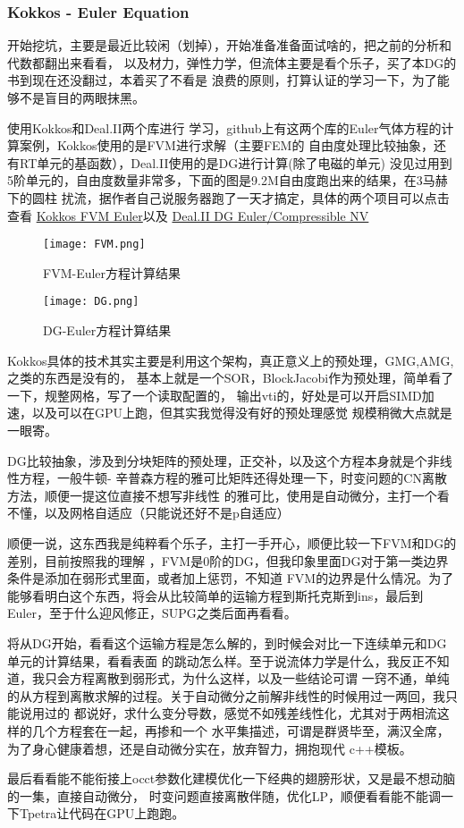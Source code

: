 \subsubsection{Kokkos - Euler Equation}
\graphicspath{ {./images/} }

开始挖坑，主要是最近比较闲（划掉），开始准备准备面试啥的，把之前的分析和代数都翻出来看看，
以及材力，弹性力学，但流体主要是看个乐子，买了本DG的书到现在还没翻过，本着买了不看是
浪费的原则，打算认证的学习一下，为了能够不是盲目的两眼抹黑。

使用Kokkos和Deal.II两个库进行
学习，github上有这两个库的Euler气体方程的计算案例，Kokkos使用的是FVM进行求解（主要FEM的
自由度处理比较抽象，还有RT单元的基函数），Deal.II使用的是DG进行计算(除了电磁的单元)
没见过用到5阶单元的，自由度数量非常多，下面的图是9.2M自由度跑出来的结果，在3马赫下的圆柱
扰流，据作者自己说服务器跑了一天才搞定，具体的两个项目可以点击查看
\href{https://github.com/pkestene/euler2d_kokkos}{Kokkos FVM Euler}以及
\href{https://github.com/conservation-laws/ryujin}{Deal.II DG Euler/Compressible NV}

\begin{figure}[htbp]
    \centering
    \texttt{[image: FVM.png]}
    \caption{FVM-Euler方程计算结果}
    \label{fig:FVM}
    \end{figure}


\begin{figure}[t]
    \centering
    \texttt{[image: DG.png]}
    \caption{DG-Euler方程计算结果}
    \label{fig:DG}
    \end{figure}

Kokkos具体的技术其实主要是利用这个架构，真正意义上的预处理，GMG,AMG,之类的东西是没有的，
基本上就是一个SOR，BlockJacobi作为预处理，简单看了一下，规整网格，写了一个读取配置的，
输出vti的，好处是可以开启SIMD加速，以及可以在GPU上跑，但其实我觉得没有好的预处理感觉
规模稍微大点就是一眼寄。 

DG比较抽象，涉及到分块矩阵的预处理，正交补，以及这个方程本身就是个非线性方程，一般牛顿-
辛普森方程的雅可比矩阵还得处理一下，时变问题的CN离散方法，顺便一提这位直接不想写非线性
的雅可比，使用是自动微分，主打一个看不懂，以及网格自适应（只能说还好不是p自适应）

顺便一说，这东西我是纯粹看个乐子，主打一手开心，顺便比较一下FVM和DG的差别，目前按照我的理解
，FVM是0阶的DG，但我印象里面DG对于第一类边界条件是添加在弱形式里面，或者加上惩罚，不知道
FVM的边界是什么情况。为了能够看明白这个东西，将会从比较简单的运输方程到斯托克斯到ins，最后到
Euler，至于什么迎风修正，SUPG之类后面再看看。

将从DG开始，看看这个运输方程是怎么解的，到时候会对比一下连续单元和DG单元的计算结果，看看表面
的跳动怎么样。至于说流体力学是什么，我反正不知道，我只会方程离散到弱形式，为什么这样，以及一些结论可谓
一窍不通，单纯的从方程到离散求解的过程。关于自动微分之前解非线性的时候用过一两回，我只能说用过的
都说好，求什么变分导数，感觉不如残差线性化，尤其对于两相流这样的几个方程套在一起，再掺和一个
水平集描述，可谓是群贤毕至，满汉全席，为了身心健康着想，还是自动微分实在，放弃智力，拥抱现代
c++模板。

最后看看能不能衔接上occt参数化建模优化一下经典的翅膀形状，又是最不想动脑的一集，直接自动微分，
时变问题直接离散伴随，优化LP，顺便看看能不能调一下Tpetra让代码在GPU上跑跑。